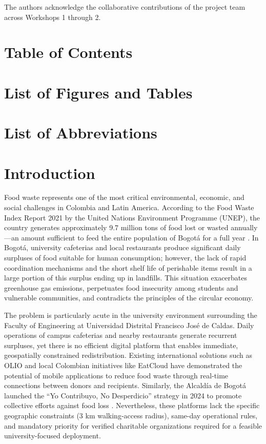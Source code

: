 \documentclass[conference]{IEEEtran}
\begin{document}
The authors acknowledge the collaborative contributions of the project team across Workshops 1 through 2.

\section{Table of Contents}

\section{List of Figures and Tables}

\section{List of Abbreviations}

\section{Introduction}
Food waste represents one of the most critical environmental, economic, and social challenges in Colombia and Latin America. According to the Food Waste Index Report 2021 by the United Nations Environment Programme (UNEP), the country generates approximately 9.7 million tons of food lost or wasted annually---an amount sufficient to feed the entire population of Bogotá for a full year \cite{unep2021}. In Bogotá, university cafeterias and local restaurants produce significant daily surpluses of food suitable for human consumption; however, the lack of rapid coordination mechanisms and the short shelf life of perishable items result in a large portion of this surplus ending up in landfills. This situation exacerbates greenhouse gas emissions, perpetuates food insecurity among students and vulnerable communities, and contradicts the principles of the circular economy.

The problem is particularly acute in the university environment surrounding the Faculty of Engineering at Universidad Distrital Francisco José de Caldas. Daily operations of campus cafeterias and nearby restaurants generate recurrent surpluses, yet there is no efficient digital platform that enables immediate, geospatially constrained redistribution. Existing international solutions such as OLIO \cite{olio2024} and local Colombian initiatives like EatCloud \cite{eatcloud2025} have demonstrated the potential of mobile applications to reduce food waste through real-time connections between donors and recipients. Similarly, the Alcaldía de Bogotá launched the ``Yo Contribuyo, No Desperdicio'' strategy in 2024 to promote collective efforts against food loss \cite{alcaldia2024}. Nevertheless, these platforms lack the specific geographic constraints (3 km walking-access radius), same-day operational rules, and mandatory priority for verified charitable organizations required for a feasible university-focused deployment.
\end{document}
